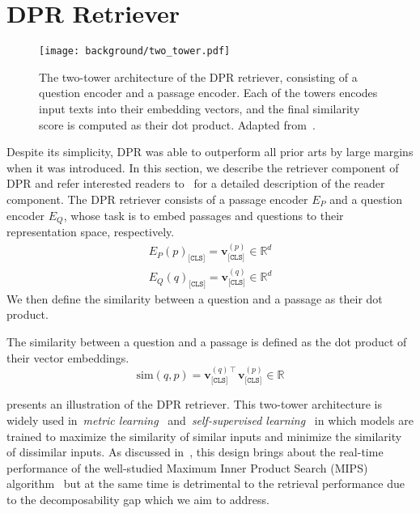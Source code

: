 \section{DPR Retriever}
\label{sec:dpr_retriever}


\begin{figure}[!htbp]
	\centering
	\texttt{[image: background/two\_tower.pdf]}
	\caption[Two-tower architecture of DPR retriever.]{
		The two-tower architecture of the DPR retriever, consisting of a question encoder and a passage encoder.
		Each of the towers encodes input texts into their embedding vectors, and the final similarity score is computed as their dot product.
		Adapted from~\cite{chen2020open}.
	}
	\label{fig:two_tower}
\end{figure}


%
Despite its simplicity, DPR was able to outperform all prior arts by large margins when it was introduced.
%
In this section, we describe the retriever component of DPR and refer interested readers to~\cite{karpukhin2020dense} for a detailed description of the reader component.
%
The DPR retriever consists of a passage encoder $E_P$ and a question encoder $E_Q$, whose task is to embed passages and questions to their representation space, respectively.
%
\begin{equation}
	\label{eq:dpr_encode}
	\begin{split}
	E_P(p)_{\texttt{[CLS]}} = \mathbf{v}^{(p)}_{\texttt{[CLS]}} \in \mathbb{R}^d \\ 
	E_Q(q)_{\texttt{[CLS]}} = \mathbf{v}^{(q)}_{\texttt{[CLS]}} \in \mathbb{R}^d
	\end{split}
\end{equation}
%
We then define the similarity between a question and a passage as their dot product.
\begin{definition}
	\label{def:sim}
	The similarity between a question and a passage is defined as the dot product of their vector embeddings.
	\begin{equation}
	\label{eq:sim_score}
	\text{sim}(q, p) = \mathbf{v}^{(q)\intercal}_{\texttt{[CLS]}} \mathbf{v}^{(p)}_{\texttt{[CLS]}} \in \mathbb{R}
	\end{equation}
\end{definition}
%
 presents an illustration of the DPR retriever.
%
This two-tower architecture is widely used in~\emph{metric learning}~\cite{han2015matchnet, song2019occlusion} and~\emph{self-supervised learning}~\cite{zbontar2021barlow, mitrovic2020representation} in which models are trained to maximize the similarity of similar inputs and minimize the similarity of dissimilar inputs.
%
As discussed in~, this design brings about the real-time performance of the well-studied Maximum Inner Product Search (MIPS) algorithm~\cite{johnson2019billion} but at the same time is detrimental to the retrieval performance due to the decomposability gap which we aim to address.

